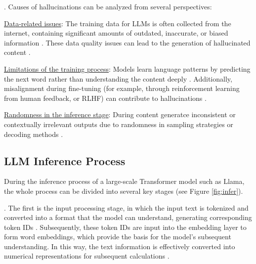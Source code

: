 .
Causes of hallucinations can be analyzed from several perspectives:
\begin{enumerate}[label={[\arabic*]}, itemsep=0pt, leftmargin=*,topsep=0pt]
    \item \underline{Data-related issues}: The training data for LLMs is often collected from the internet, containing significant amounts of outdated, inaccurate, or biased information \cite{tonmoy2024comprehensive, rawte2023survey, zhang2023siren}. These data quality issues can lead to the generation of hallucinated content .
    \item \underline{Limitations of the training process}: Models learn language patterns by predicting the next word rather than understanding the content deeply \cite{rawte2023survey, huang2023survey, ji2023survey}. Additionally, misalignment during fine-tuning (for example, through reinforcement learning from human feedback, or RLHF) can contribute to hallucinations .
    \item \underline{Randomness in the inference stage}: During content generatce inconsistent or contextually irrelevant outputs due to randomness in sampling strategies or decoding methods \cite{tonmoy2024comprehensive, huang2023survey, ji2023survey}.
\end{enumerate}



\subsection{LLM Inference Process}\label{sec:back:infer}

During the inference process of a large-scale Transformer model such as Llama, the whole process can be divided into several key stages (see Figure \ref{fig:infer}).

. The first is the input processing stage, in which the input text is tokenized and converted into a format that the model can understand, generating corresponding token IDs \cite{mickus2022dissect}. Subsequently, these token IDs are input into the embedding layer to form word embeddings, which provide the basis for the model's subsequent understanding. In this way, the text information is effectively converted into numerical representations for subsequent calculations \cite{dar2022analyzing}.

